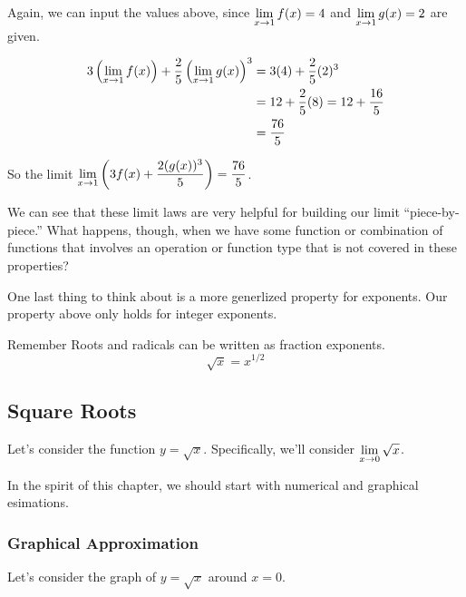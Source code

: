 \begin{enumerate}
  Again, we can input the values above, since $\displaystyle \lim_{x\to1} f(x) = 4$ and $\displaystyle \lim_{x\to 1}g(x) = 2$ are given.

  \begin{align*}
    3\left(\displaystyle \lim_{x\to 1} f(x)\right) + \dfrac{2}{5}\left(\displaystyle \lim_{x\to 1}g(x)\right)^3 & =3(4) + \dfrac{2}{5}(2)^3 \\
    &= 12 + \dfrac{2}{5}(8) = 12 + \dfrac{16}{5}\\
    & = \dfrac{76}{5}
  \end{align*}

  So the limit $\displaystyle \lim_{x\to 1} \left(3f(x)+\dfrac{2(g(x))^3}{5}\right) = \dfrac{76}{5}$.
\end{enumerate}

We can see that these limit laws are very helpful for building our limit ``piece-by-piece.''
What happens, though, when we have some function or combination of functions that involves an operation or function type that is not covered in these properties?

One last thing to think about is a more generlized property for exponents.
Our property above only holds for integer exponents.
\begin{note}{Remember}
  Roots and radicals can be written as fraction exponents.
  \[\sqrt{x} = x^{1/2}\]
\end{note}

\subsection*{Square Roots}

Let's consider the function $y=\sqrt{x}$.
Specifically, we'll consider $\displaystyle \lim_{x\to 0} \sqrt{x}$.

In the spirit of this chapter, we should start with numerical and graphical esimations.

\subsubsection*{Graphical Approximation}

Let's consider the graph of $y=\sqrt{x}$ around $x=0$.

